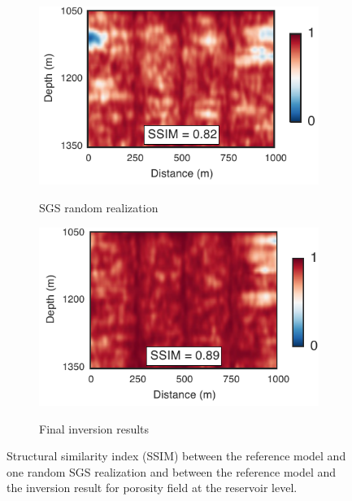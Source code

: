 \begin{figure}[!ht]
        \centering
        \begin{subfigure}[b]{.5\textwidth}
                \caption{SGS random realization}
                \includegraphics[width=\textwidth]{fig/ssim_res_a.pdf}
                \label{fig:ssim_res_a}
        \end{subfigure}%
        \begin{subfigure}[b]{.5\textwidth}
                \caption{Final inversion results}
                \includegraphics[width=\textwidth]{fig/ssim_res_b.pdf}
                \label{fig:ssim_res_b}
        \end{subfigure}
        \caption{Structural similarity index (SSIM) between the reference model
and one random SGS realization and between the reference model and the inversion
result for porosity field at the reservoir level.}
        \label{fig:SSIM_res}
\end{figure}
